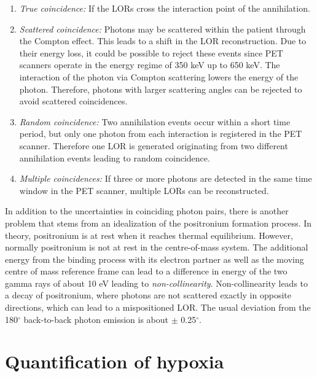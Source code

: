 \begin{enumerate}
\item \textit{True coincidence: }If the LORs cross the interaction point of the annihilation.
\item \textit{Scattered coincidence: }Photons may be scattered within the patient through the Compton effect. This leads to a shift in the LOR reconstruction. Due to their energy loss, it could be possible to reject these events since PET scanners operate in the energy regime of 350 keV up to 650 keV. The interaction of the photon via Compton scattering lowers the energy of the photon. Therefore, photons with larger scattering angles can be rejected to avoid scattered coincidences.\
\item \textit{Random coincidence: }Two annihilation events occur within a short time period, but only one photon from each interaction is registered in the PET scanner. Therefore one LOR is generated originating from two different annihilation events leading to random coincidence. 
\item \textit{Multiple coincidences: }If three or more photons are detected in the same time window in the PET scanner, multiple LORs can be reconstructed.
\end{enumerate}
In addition to the uncertainties in coinciding photon pairs, there is another problem that stems from an idealization of the positronium formation process. In theory, positronium is at rest when it reaches thermal equilibrium. However, normally positronium is not at rest in the centre-of-mass system. The additional energy from the binding process with its electron partner as well as the moving centre of mass reference frame can lead to a difference in energy of the two gamma rays of about 10 eV leading to \textit{non-collinearity}. Non-collinearity leads to a decay of positronium, where photons are not scattered exactly in opposite directions, which can lead to a mispositioned LOR. The usual deviation from the 180$^\circ$ back-to-back photon emission is about $\pm$ 0.25$^\circ$\cite{Cherry}.

\section{Quantification of hypoxia}
